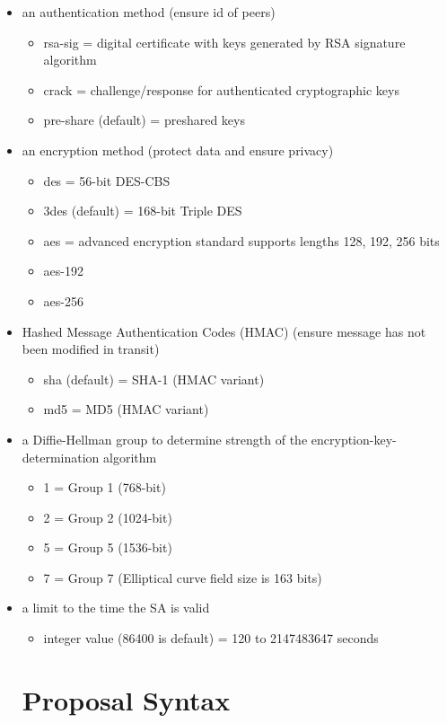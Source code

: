 \documentclass{report}
\newcommand{\squash}{\itemsep=0pt\parskip=0pt}
\begin{document}
\begin{itemize}
  \squash
\item an authentication method (ensure id of peers)
  \begin{itemize}
 \squash
  \item rsa-sig = digital certificate with keys generated by RSA signature algorithm
  \item crack = challenge/response for authenticated cryptographic keys
  \item pre-share (default) = preshared keys
  \end{itemize}
\item an encryption method (protect data and ensure privacy)
  \begin{itemize}
 \squash
  \item des = 56-bit DES-CBS
  \item 3des (default) = 168-bit Triple DES
  \item aes = advanced encryption standard supports lengths 128, 192, 256 bits
  \item aes-192
  \item aes-256  
  \end{itemize}
\item Hashed Message Authentication Codes (HMAC) (ensure message has not been modified in transit)
  \begin{itemize}
 \squash
  \item sha (default) = SHA-1 (HMAC variant)
  \item md5 = MD5 (HMAC variant)
  \end{itemize}
\item a Diffie-Hellman group to determine strength of the encryption-key-determination algorithm
  \begin{itemize}
 \squash
  \item 1 = Group 1 (768-bit)
  \item 2 = Group 2 (1024-bit)
  \item 5 = Group 5 (1536-bit)
  \item 7 = Group 7 (Elliptical curve field size is 163 bits)
  \end{itemize}
\item a limit to the time the SA is valid
  \begin{itemize}
 \squash
  \item integer value (86400 is default) = 120 to 2147483647 seconds
  \end{itemize}

\chapter {Proposal Syntax}


\end{itemize}
\end{document}
